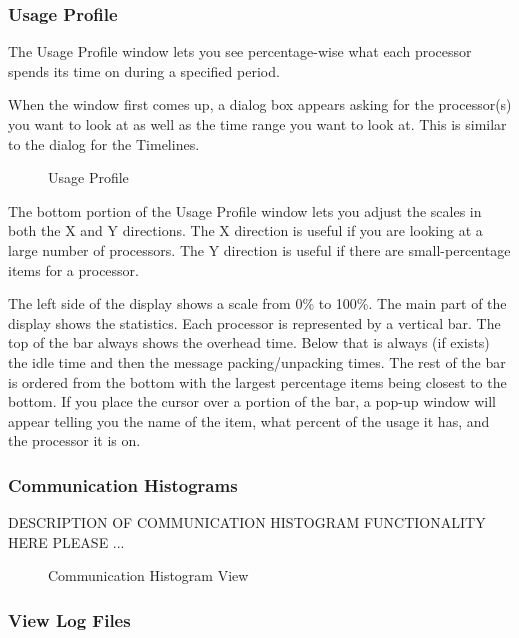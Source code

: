 \documentclass[10pt,dvips]{article}
\begin{document}
\subsubsection{Usage Profile}

The Usage Profile window lets you see percentage-wise what each processor
spends its time on during a specified period.

When the window first comes up, a dialog box appears asking for the
processor(s) you want to look at as well as the time range you want to
look at.  This is similar to the dialog for the Timelines.

\begin{figure}[htb]
\center
{}
\caption{Usage Profile}
\label{usage profile}
\end{figure}

The bottom portion of the Usage Profile window lets you adjust the
scales in both the X and Y directions.  The X direction is useful if
you are looking at a large number of processors.  The Y direction is
useful if there are small-percentage items for a processor.

The left side of the display shows a scale from 0\% to 100\%.  The
main part of the display shows the statistics.  Each processor is
represented by a vertical bar.  The top of the bar always shows the
overhead time.  Below that is always (if exists) the idle time and
then the message packing/unpacking times.  The rest of the bar is
ordered from the bottom with the largest percentage items being
closest to the bottom.  If you place the cursor over a portion of the
bar, a pop-up window will appear telling you the name of the item,
what percent of the usage it has, and the processor it is on.

\subsubsection{Communication Histograms}

DESCRIPTION OF COMMUNICATION HISTOGRAM FUNCTIONALITY HERE PLEASE ...

\begin{figure}[htb]
\center
{}
\caption{Communication Histogram View}
\label{communication histogram}
\end{figure}

\subsubsection{View Log Files}
\end{document}
